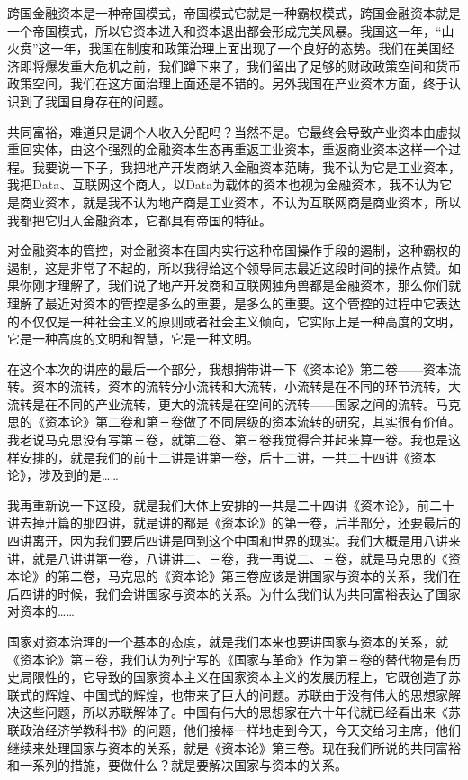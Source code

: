 \documentclass[UTF8, 12pt, a4paper]{ctexrep}
\begin{document}
跨国金融资本是一种帝国模式，帝国模式它就是一种霸权模式，跨国金融资本就是一个帝国模式，所以它资本进入和资本退出都会形成完美风暴。我国这一年，“山火贲”这一年，我国在制度和政策治理上面出现了一个良好的态势。我们在美国经济即将爆发重大危机之前，我们蹲下来了，我们留出了足够的财政政策空间和货币政策空间，我们在这方面治理上面还是不错的。另外我国在产业资本方面，终于认识到了我国自身存在的问题。

共同富裕，难道只是调个人收入分配吗？当然不是。它最终会导致产业资本由虚拟重回实体，由这个强烈的金融资本生态再重返工业资本，重返商业资本这样一个过程。我要说一下子，我把地产开发商纳入金融资本范畴，我不认为它是工业资本，我把Data、互联网这个商人，以Data为载体的资本也视为金融资本，我不认为它是商业资本，就是我不认为地产商是工业资本，不认为互联网商是商业资本，所以我都把它归入金融资本，它都具有帝国的特征。

对金融资本的管控，对金融资本在国内实行这种帝国操作手段的遏制，这种霸权的遏制，这是非常了不起的，所以我得给这个领导同志最近这段时间的操作点赞。如果你刚才理解了，我们说了地产开发商和互联网独角兽都是金融资本，那么你们就理解了最近对资本的管控是多么的重要，是多么的重要。这个管控的过程中它表达的不仅仅是一种社会主义的原则或者社会主义倾向，它实际上是一种高度的文明，它是一种高度的文明和智慧，它是一种文明。

在这个本次的讲座的最后一个部分，我想捎带讲一下《资本论》第二卷——资本流转。资本的流转，资本的流转分小流转和大流转，小流转是在不同的环节流转，大流转是在不同的产业流转，更大的流转是在空间的流转——国家之间的流转。马克思的《资本论》第二卷和第三卷做了不同层级的资本流转的研究，其实很有价值。我老说马克思没有写第三卷，就第二卷、第三卷我觉得合并起来算一卷。我也是这样安排的，就是我们的前十二讲是讲第一卷，后十二讲，一共二十四讲《资本论》，涉及到的是……

我再重新说一下这段，就是我们大体上安排的一共是二十四讲《资本论》，前二十讲去掉开篇的那四讲，就是讲的都是《资本论》的第一卷，后半部分，还要最后的四讲离开，因为我们要后四讲是回到这个中国和世界的现实。我们大概是用八讲来讲，就是八讲讲第一卷，八讲讲二、三卷，我一再说二、三卷，就是马克思的《资本论》的第二卷，马克思的《资本论》第三卷应该是讲国家与资本的关系，我们在后四讲的时候，我们会讲国家与资本的关系。为什么我们认为共同富裕表达了国家对资本的……

国家对资本治理的一个基本的态度，就是我们本来也要讲国家与资本的关系，就《资本论》第三卷，我们认为列宁写的《国家与革命》作为第三卷的替代物是有历史局限性的，它导致的国家资本主义在国家资本主义的发展历程上，它既创造了苏联式的辉煌、中国式的辉煌，也带来了巨大的问题。苏联由于没有伟大的思想家解决这些问题，所以苏联解体了。中国有伟大的思想家在六十年代就已经看出来《苏联政治经济学教科书》的问题，他们接棒一样地走到今天，今天交给习主席，他们继续来处理国家与资本的关系，就是《资本论》第三卷。现在我们所说的共同富裕和一系列的措施，要做什么？就是要解决国家与资本的关系。
\end{document}
